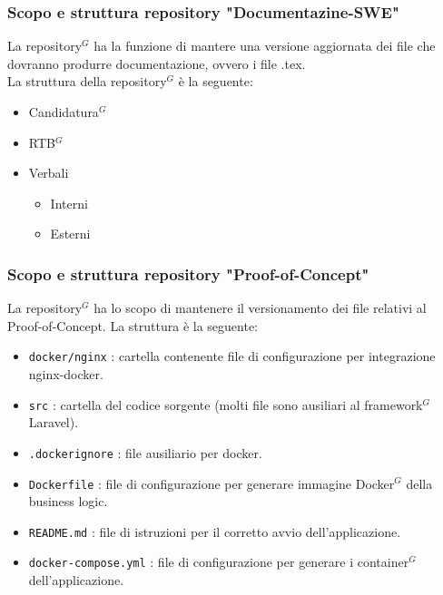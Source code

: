\documentclass[a4paper,10pt]{article}
\begin{document}
\subsubsection{Scopo e struttura repository "Documentazine-SWE"}
La repository$^G$ ha la funzione di mantere una versione aggiornata dei file che dovranno produrre documentazione, ovvero i file .tex.\\
La struttura della repository$^G$ è la seguente:
\begin{itemize}
  \item Candidatura$^G$
  \item RTB$^G$
  \item Verbali 
  \begin{itemize}
    \item Interni
    \item Esterni
  \end{itemize}
\end{itemize}
\subsubsection{Scopo e struttura repository "Proof-of-Concept"}
La repository$^G$ ha lo scopo di mantenere il versionamento dei file relativi al Proof-of-Concept.
La struttura è la seguente:
\begin{itemize}
  \item \texttt{docker/nginx} : cartella contenente file di configurazione per integrazione nginx-docker.
  \item \texttt{src} : cartella del codice sorgente (molti file sono ausiliari al framework$^G$ Laravel).
  \item \texttt{.dockerignore} : file ausiliario per docker.
  \item \texttt{Dockerfile} : file di configurazione per generare immagine Docker$^G$ della business logic.
  \item \texttt{README.md} : file di istruzioni per il corretto avvio dell'applicazione.
  \item \texttt{docker-compose.yml} : file di configurazione per generare i container$^G$ dell'applicazione.
\end{itemize}
\end{document}
